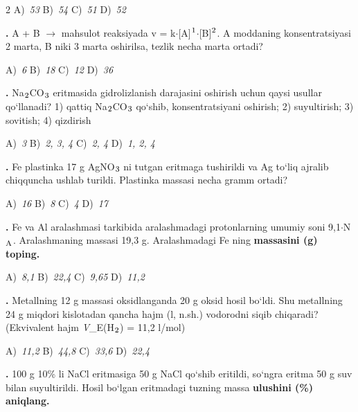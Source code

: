 \documentclass[11pt,a4paper]{article}
\renewcommand{\textsubscript}[1]{\ensuremath{_{\text{\fontsize{8}{8}\selectfont #1}}}}
\renewcommand{\textsuperscript}[1]{\ensuremath{^{\text{\fontsize{8}{8}\selectfont #1}}}}
\newcommand{\qn}[1]{\textbf{\fontsize{11.5}{13}\selectfont #1}}
\newcommand{\qsep}{\par\vspace{13pt}}
\begin{document}
\begin{multicols}{2}
\noindent A)~\textsl{53} \hfill B)~\textsl{54} \hfill C)~\textsl{51} \hfill D)~\textsl{52}\par
\qsep
\noindent\qn{5.} A + B $\to$ mahsulot reaksiyada v = k$\cdot$[A]\textsuperscript{1}$\cdot$[B]\textsuperscript{2}. A moddaning konsentratsiyasi 2 marta, B niki 3 marta oshirilsa, tezlik necha marta ortadi?

\noindent A)~\textsl{6} \hfill B)~\textsl{18} \hfill C)~\textsl{12} \hfill D)~\textsl{36}\par
\qsep
\noindent\qn{6.} Na\textsubscript{2}CO\textsubscript{3} eritmasida gidrolizlanish darajasini oshirish uchun qaysi usullar qo`llanadi? 1) qattiq Na\textsubscript{2}CO\textsubscript{3} qo`shib, konsentratsiyani oshirish; 2) suyultirish; 3) sovitish; 4) qizdirish

\noindent A)~\textsl{3} \hfill B)~\textsl{2, 3, 4} \hfill C)~\textsl{2, 4} \hfill D)~\textsl{1, 2, 4}\par
\qsep
\noindent\qn{7.} Fe plastinka 17 g AgNO\textsubscript{3} ni tutgan eritmaga tushirildi va Ag to`liq ajralib chiqquncha ushlab turildi. Plastinka massasi necha gramm ortadi?

\noindent A)~\textsl{16} \hfill B)~\textsl{8} \hfill C)~\textsl{4} \hfill D)~\textsl{17}\par
\qsep
\noindent\qn{8.} Fe va Al aralashmasi tarkibida aralashmadagi protonlarning umumiy soni 9,1$\cdot$N\textsubscript{A}. Aralashmaning massasi 19,3 g. Aralashmadagi Fe ning \textbf{massasini (g) toping.}

\noindent A)~\textsl{8,1} \hfill B)~\textsl{22,4} \hfill C)~\textsl{9,65} \hfill D)~\textsl{11,2}\par
\qsep
\noindent\qn{9.} Metallning 12 g massasi oksidlanganda 20 g oksid hosil bo`ldi. Shu metallning 24 g miqdori kislotadan qancha hajm (l, n.sh.) vodorodni siqib chiqaradi? (Ekvivalent hajm \textit{V}\_E(H\textsubscript{2}) = 11,2 l/mol)

\noindent A)~\textsl{11,2} \hfill B)~\textsl{44,8} \hfill C)~\textsl{33,6} \hfill D)~\textsl{22,4}\par
\qsep
\noindent\qn{10.} 100 g 10\% li NaCl eritmasiga 50 g NaCl qo`shib eritildi, so`ngra eritma 50 g suv bilan suyultirildi. Hosil bo`lgan eritmadagi tuzning massa \textbf{ulushini (\%) aniqlang.}


\end{multicols}
\end{document}
